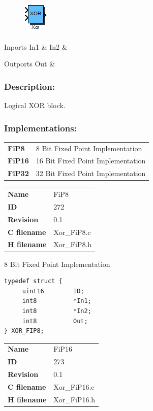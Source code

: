 \label{block:Xor}
\begin{figure}[H]\includegraphics{Xor}\end{figure} 

\begin{XtoCtabular}{Inports}
In1 & \tabularnewline
\hline
In2 & \tabularnewline
\hline
\end{XtoCtabular}


\begin{XtoCtabular}{Outports}
Out & \tabularnewline
\hline
\end{XtoCtabular}

\subsubsection*{Description:}
Logical XOR block.

\subsubsection*{Implementations:}
\begin{tabular}{l l}
\textbf{FiP8} & 8 Bit Fixed Point Implementation\tabularnewline
\textbf{FiP16} & 16 Bit Fixed Point Implementation\tabularnewline
\textbf{FiP32} & 32 Bit Fixed Point Implementation\tabularnewline
\end{tabular}

\nopagebreak[0]
\begin{tabular}{l l}
\textbf{Name} & FiP8 \tabularnewline
\textbf{ID} & 272 \tabularnewline
\textbf{Revision} & 0.1 \tabularnewline
\textbf{C filename} & Xor\_FiP8.c \tabularnewline
\textbf{H filename} & Xor\_FiP8.h \tabularnewline
\end{tabular}
\vspace{1ex}

8 Bit Fixed Point Implementation

\begin{lstlisting}
typedef struct {
     uint16        ID;
     int8          *In1;
     int8          *In2;
     int8          Out;
} XOR_FIP8;
\end{lstlisting}

\ifdefined \AddTestReports
{}
\fi
{}
\nopagebreak[0]
\begin{tabular}{l l}
\textbf{Name} & FiP16 \tabularnewline
\textbf{ID} & 273 \tabularnewline
\textbf{Revision} & 0.1 \tabularnewline
\textbf{C filename} & Xor\_FiP16.c \tabularnewline
\textbf{H filename} & Xor\_FiP16.h \tabularnewline
\end{tabular}
\vspace{1ex}

